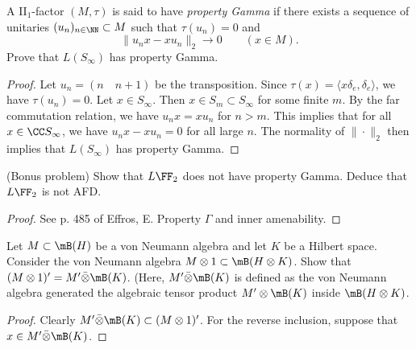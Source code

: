 \documentclass{article}
\begin{document}
 A II$_1$-factor $(M, \tau)$ is said to have \emph{property Gamma} if there exists a sequence of unitaries $(u_n)_{n \in \NN} \subset M$ such that $\tau(u_n) = 0$ and
$$ \| u_nx - xu_n \|_2 \to 0 \qquad (x \in M).$$
Prove that $L(S_\infty)$ has property Gamma.
\begin{proof}
  Let $u_n = (n \quad n+1)$ be the transposition. Since $\tau(x) = \langle x \delta_e, \delta_e \rangle$, we have $\tau(u_n) = 0$.  Let $x \in S_\infty$.  Then $x \in S_m \subset S_\infty$ for some finite $m$.  By the far commutation relation, we have $u_n x = x u_n$ for $n > m$.  This implies that for all $x \in \CC S_\infty$, we have $u_n x - x u_n = 0$ for all large $n$.  The normality of $\| \cdot \|_2$ then implies that $L(S_\infty)$ has property Gamma.  
\end{proof}

 (Bonus problem) Show that $L\FF_2$ does not have property Gamma. Deduce that $L \FF_2$ is not AFD.
\begin{proof}
  See p. 485 of Effros, E. Property $\Gamma$ and inner amenability.
\end{proof}

 Let $M \subset \mB(H)$ be a von Neumann algebra and let $K$ be a Hilbert space. Consider the von
Neumann algebra $M \otimes 1 \subset \mB(H \otimes K)$. Show that $(M \otimes 1)' = M' \bar{\otimes} \mB(K)$.
(Here, $M' \bar{\otimes} \mB(K)$ is defined as the von Neumann algebra generated the algebraic
tensor product $M' \otimes \mB(K)$ inside $\mB(H \otimes K)$.
\begin{proof}
  Clearly $M' \bar\otimes \mB(K) \subset (M \otimes 1)'$.  For the reverse inclusion, suppose that $x \in M' \bar\otimes \mB(K)$.
\end{proof}
\end{document}
